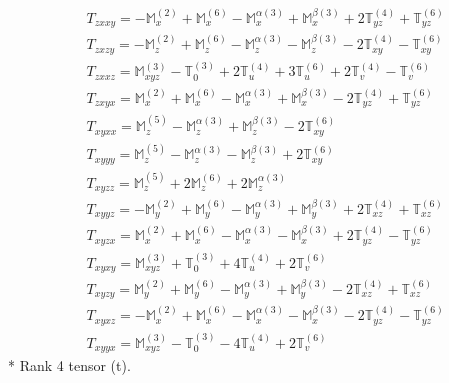 \documentclass[fleqn,8pt,landscape]{jsarticle}
\begin{document}
\begin{align*}
& T_{zxxy} = - \mathbb{M}_{x}^{(2)} + \mathbb{M}_{x}^{(6)} - \mathbb{M}_{x}^{\alpha(3)} + \mathbb{M}_{x}^{\beta(3)} + 2 \mathbb{T}_{yz}^{(4)} + \mathbb{T}_{yz}^{(6)} \\
& T_{zxzy} = - \mathbb{M}_{z}^{(2)} + \mathbb{M}_{z}^{(6)} - \mathbb{M}_{z}^{\alpha(3)} - \mathbb{M}_{z}^{\beta(3)} - 2 \mathbb{T}_{xy}^{(4)} - \mathbb{T}_{xy}^{(6)} \\
& T_{zxxz} = \mathbb{M}_{xyz}^{(3)} - \mathbb{T}_{0}^{(3)} + 2 \mathbb{T}_{u}^{(4)} + 3 \mathbb{T}_{u}^{(6)} + 2 \mathbb{T}_{v}^{(4)} - \mathbb{T}_{v}^{(6)} \\
& T_{zxyx} = \mathbb{M}_{x}^{(2)} + \mathbb{M}_{x}^{(6)} - \mathbb{M}_{x}^{\alpha(3)} + \mathbb{M}_{x}^{\beta(3)} - 2 \mathbb{T}_{yz}^{(4)} + \mathbb{T}_{yz}^{(6)} \\
& T_{xyxx} = \mathbb{M}_{z}^{(5)} - \mathbb{M}_{z}^{\alpha(3)} + \mathbb{M}_{z}^{\beta(3)} - 2 \mathbb{T}_{xy}^{(6)} \\
& T_{xyyy} = \mathbb{M}_{z}^{(5)} - \mathbb{M}_{z}^{\alpha(3)} - \mathbb{M}_{z}^{\beta(3)} + 2 \mathbb{T}_{xy}^{(6)} \\
& T_{xyzz} = \mathbb{M}_{z}^{(5)} + 2 \mathbb{M}_{z}^{(6)} + 2 \mathbb{M}_{z}^{\alpha(3)} \\
& T_{xyyz} = - \mathbb{M}_{y}^{(2)} + \mathbb{M}_{y}^{(6)} - \mathbb{M}_{y}^{\alpha(3)} + \mathbb{M}_{y}^{\beta(3)} + 2 \mathbb{T}_{xz}^{(4)} + \mathbb{T}_{xz}^{(6)} \\
& T_{xyzx} = \mathbb{M}_{x}^{(2)} + \mathbb{M}_{x}^{(6)} - \mathbb{M}_{x}^{\alpha(3)} - \mathbb{M}_{x}^{\beta(3)} + 2 \mathbb{T}_{yz}^{(4)} - \mathbb{T}_{yz}^{(6)} \\
& T_{xyxy} = \mathbb{M}_{xyz}^{(3)} + \mathbb{T}_{0}^{(3)} + 4 \mathbb{T}_{u}^{(4)} + 2 \mathbb{T}_{v}^{(6)} \\
& T_{xyzy} = \mathbb{M}_{y}^{(2)} + \mathbb{M}_{y}^{(6)} - \mathbb{M}_{y}^{\alpha(3)} + \mathbb{M}_{y}^{\beta(3)} - 2 \mathbb{T}_{xz}^{(4)} + \mathbb{T}_{xz}^{(6)} \\
& T_{xyxz} = - \mathbb{M}_{x}^{(2)} + \mathbb{M}_{x}^{(6)} - \mathbb{M}_{x}^{\alpha(3)} - \mathbb{M}_{x}^{\beta(3)} - 2 \mathbb{T}_{yz}^{(4)} - \mathbb{T}_{yz}^{(6)} \\
& T_{xyyx} = \mathbb{M}_{xyz}^{(3)} - \mathbb{T}_{0}^{(3)} - 4 \mathbb{T}_{u}^{(4)} + 2 \mathbb{T}_{v}^{(6)}
\end{align*}
* Rank 4 tensor (t).
\end{document}

